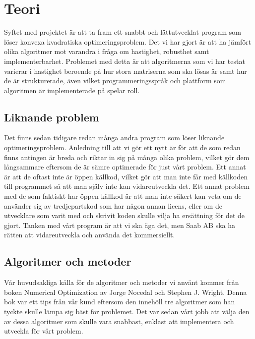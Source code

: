 \section{Teori}
Syftet med projektet är att ta fram ett snabbt och lättutvecklat program som löser konvexa kvadratiska optimeringsproblem. Det vi har gjort är att ha jämfört olika algoritmer mot varandra i fråga om hastighet, robusthet samt implementerbarhet. Problemet med detta är att algoritmerna som vi har testat varierar i hastighet beroende på hur stora matriserna som ska lösas är samt hur de är strukturerade, även vilket programmeringsspråk och plattform som algoritmen är implementerade på spelar roll.

\subsection{Liknande problem}
Det finns sedan tidigare redan många andra program som löser liknande optimeringsproblem. Anledning till att vi gör ett nytt är för att de som redan finns antingen är breda och riktar in sig på många olika problem, vilket gör dem långsammare eftersom de är sämre optimerade för just vårt problem. Ett annat är att de oftast inte är öppen källkod, vilket gör att man inte får med källkoden till programmet så att man själv inte kan vidareutveckla det. Ett annat problem med de som faktiskt har öppen källkod är att man inte säkert kan veta om de använder sig av tredjepartskod som har någon annan licens, eller om de utvecklare som varit med och skrivit koden skulle vilja ha ersättning för det de gjort.
Tanken med vårt program är att vi ska äga det, men Saab AB ska ha rätten att vidareutveckla och använda det kommersiellt.

\subsection{Algoritmer och metoder}
Vår huvudsakliga källa för de algoritmer och metoder vi använt kommer från boken Numerical Optimization av Jorge Nocedal och Stephen J. Wright. Denna bok var ett tips från vår kund eftersom den innehöll tre algoritmer som han tyckte skulle lämpa sig bäst för problemet. Det var sedan vårt jobb att välja den av dessa algoritmer som skulle vara snabbast, enklast att implementera och utveckla för vårt problem.

